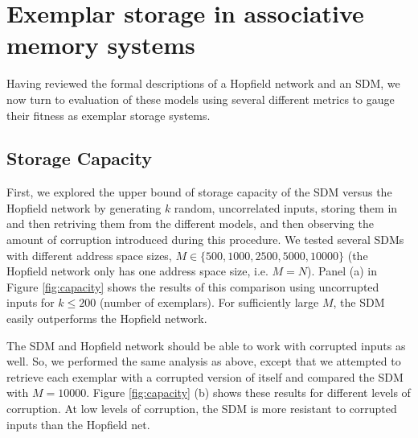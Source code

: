 \documentclass[10pt,letterpaper]{article}
\begin{document}
\section{Exemplar storage in associative memory systems}

Having reviewed the formal descriptions of a Hopfield network and an SDM, we now turn to evaluation of these models using several different
metrics to gauge their fitness as exemplar storage systems.

\subsection{Storage Capacity}

First, we explored the upper bound of storage capacity of the SDM
versus the Hopfield network by generating $k$ random, uncorrelated
inputs, storing them in and then retriving them from the different
models, and then observing the amount of corruption introduced during
this procedure. We tested several SDMs with different address space
sizes, $M\in\{500, 1000, 2500, 5000, 10000\}$ (the Hopfield network
only has one address space size, i.e. $M=N$).  Panel (a) in Figure
\ref{fig:capacity} shows the results of this comparison using
uncorrupted inputs for $k\leq 200$ (number of exemplars). For
sufficiently large $M$, the SDM easily outperforms the Hopfield
network.

The SDM and Hopfield network should be able to work with corrupted
inputs as well. So, we performed the same analysis as above, except
that we attempted to retrieve each exemplar with a corrupted version
of itself and compared the SDM with $M=10000$.  Figure \ref{fig:capacity} (b)
shows these results for different levels of corruption. At low levels
of corruption, the SDM is more resistant to corrupted inputs than the
Hopfield net. 
\end{document}
